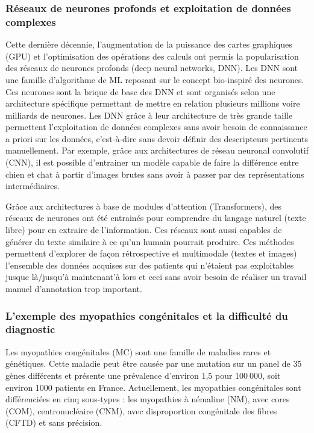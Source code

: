 \subsubsection{Réseaux de neurones profonds et exploitation de données complexes}

Cette dernière décennie, l’augmentation de la puissance des cartes graphiques (GPU) et l’optimisation des opérations des calculs ont permis la popularisation des réseaux de neurones profonds (deep neural networks, DNN). Les DNN sont une famille d’algorithme de ML reposant sur le concept bio-inspiré des neurones. Ces neurones sont la brique de base des DNN et sont organisés selon une architecture spécifique permettant de mettre en relation plusieurs millions voire milliards de neurones. Les DNN grâce à leur architecture de très grande taille permettent l’exploitation de données complexes sans avoir besoin de connaissance a priori sur les données, c’est-à-dire sans devoir définir des descripteurs pertinents manuellement.
Par exemple, grâce aux architectures de réseau neuronal convolutif (CNN), il est possible d’entrainer un modèle capable de faire la différence entre chien et chat à partir d’images brutes sans avoir à passer par des représentations intermédiaires. 

Grâce aux architectures à base de modules d’attention (Transformers), des réseaux de neurones ont été entrainés pour comprendre du langage naturel (texte libre) pour en extraire de l’information. Ces réseaux sont aussi capables de générer du texte similaire à ce qu’un humain pourrait produire.
Ces méthodes permettent d’explorer de façon rétrospective et multimodale (textes et images) l’ensemble des données acquises sur des patients qui n’étaient pas exploitables jusque là/jusqu’à maintenant’à lors et ceci sans avoir besoin de réaliser un travail manuel d’annotation trop important.

\subsubsection{L’exemple des myopathies congénitales et la difficulté du diagnostic}

Les myopathies congénitales (MC) sont une famille de maladies rares et génétiques. Cette maladie peut être causée par une mutation sur un panel de 35 gènes différents et présente une prévalence d’environ 1,5 pour 100 000, soit environ 1000 patients en France. Actuellement, les myopathies congénitales sont différenciées en cinq sous-types : les myopathies à némaline (NM), avec cores (COM), centronucléaire (CNM), avec disproportion congénitale des fibres (CFTD) et sans précision.


